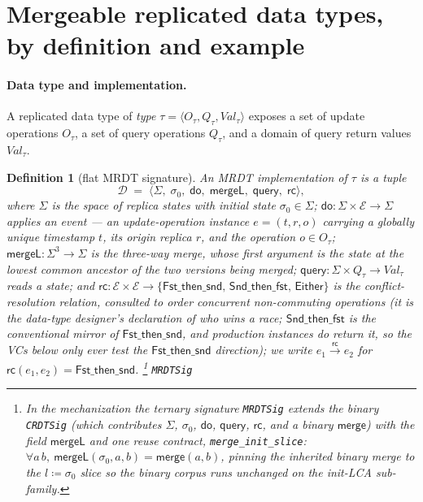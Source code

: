 \documentclass[11pt]{article}
\newtheorem{definition}[theorem]{Definition}
\newcommand{\rc}{\xrightarrow{\mathsf{rc}}}      %
\newcommand{\rcrel}{\mathsf{rc}}                 %
\newcommand{\Merge}{\mathsf{merge}}
\newcommand{\mergeL}{\mathsf{mergeL}}
\newcommand{\Sinit}{\sigma_0}
\newcommand{\lean}[1]{\texttt{#1}}
\newcommand{\M}[1]{\mathcal{#1}}
\newcommand{\Either}{\textsf{Either}}
\begin{document}
\section{Mergeable replicated data types, by definition and example}
\label{sec:mrdts}

\paragraph{Data type and implementation.} A replicated data type of
\emph{type} $\tau = \langle O_\tau, Q_\tau, \mathit{Val}_\tau\rangle$
exposes a set of update operations $O_\tau$, a set of query operations
$Q_\tau$, and a domain of query return values $\mathit{Val}_\tau$.

\begin{definition}[flat MRDT signature]
\label{def:mrdtsig}
An \emph{MRDT implementation} of $\tau$ is a tuple
\[
  \M{D} \;=\; \langle \Sigma,\; \Sinit,\; \mathsf{do},\; \mergeL,\;
  \mathsf{query},\; \rcrel \rangle ,
\]
where $\Sigma$ is the space of replica states with initial state
$\Sinit \in \Sigma$; $\mathsf{do} : \Sigma \times \M{E} \to \Sigma$
applies an \emph{event} --- an update-operation instance $e = (t, r, o)$
carrying a globally unique timestamp $t$, its origin replica $r$, and
the operation $o \in O_\tau$; $\mergeL : \Sigma^3 \to \Sigma$ is the
three-way merge, whose first argument is the state at the lowest common
ancestor of the two versions being merged; $\mathsf{query} : \Sigma
\times Q_\tau \to \mathit{Val}_\tau$ reads a state; and $\rcrel :
\M{E} \times \M{E} \to \{\textsf{Fst\_then\_snd},\,
\textsf{Snd\_then\_fst},\, \Either\}$ is the
\emph{conflict-resolution} relation, consulted to order concurrent
non-commuting operations (it is the data-type designer's declaration of
who wins a race; $\textsf{Snd\_then\_fst}$ is the conventional mirror of
$\textsf{Fst\_then\_snd}$, and production instances do return it, so the
VCs below only ever test the $\textsf{Fst\_then\_snd}$ direction); we
write $e_1 \rc e_2$ for $\rcrel(e_1,e_2) =
\textsf{Fst\_then\_snd}$.%
\footnote{In the mechanization the ternary signature \lean{MRDTSig}
extends the binary \lean{CRDTSig} (which contributes $\Sigma$, $\Sinit$,
$\mathsf{do}$, $\mathsf{query}$, $\rcrel$, and a \emph{binary}
$\Merge$) with the field $\mergeL$ and one reuse contract,
\lean{merge\_init\_slice}: $\forall a\, b,\ \mergeL(\Sinit, a, b) =
\Merge(a, b)$, pinning the inherited binary merge to the
$l \coloneqq \Sinit$ slice so the binary corpus runs unchanged on the
init-LCA sub-family.}
\hfill\lean{MRDTSig}
\end{definition}
\end{document}

